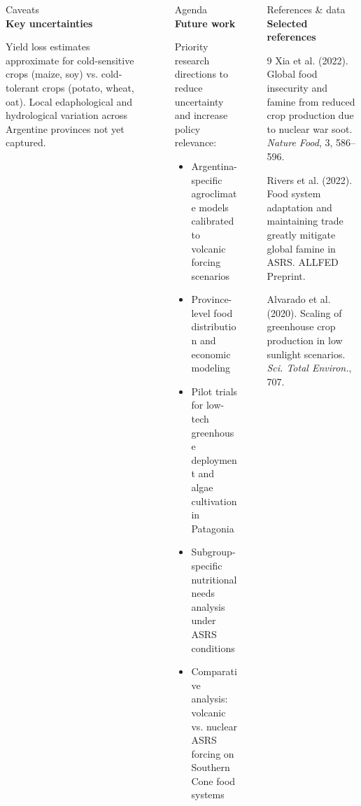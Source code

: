 \documentclass[final]{beamer}
\newlength{\sepwidth}
\newlength{\colwidth}
\newenvironment{labelblock}[2]{%
  \begin{block}{%
      {\small\color{structure.fg!70!bg}#1}%
      \\[2pt]                                  %
      {\large\bfseries#2}%
      }%
      }{%
  \end{block}%
  }
\newcommand{\separatorcolumn}{\begin{column}{\sepwidth}\end{column}}
\begin{document}
\begin{frame}[t]
\begin{columns}[t]
\begin{column}{\colwidth}
\begin{labelblock}{Caveats}{Key uncertainties}
        Yield loss estimates approximate for cold-sensitive crops (maize, soy) vs. cold-tolerant crops (potato, wheat, oat). Local edaphological and hydrological variation across Argentine provinces not yet captured.
      \end{labelblock}
    \end{column}

    \separatorcolumn

    \begin{column}{\colwidth}
      \begin{labelblock}{Agenda}{Future work}
        Priority research directions to reduce uncertainty and increase policy relevance:
        \begin{itemize}
          \item Argentina-specific agroclimate models calibrated to volcanic forcing scenarios
          \item Province-level food distribution and economic modeling
          \item Pilot trials for low-tech greenhouse deployment and algae cultivation in Patagonia
          \item Subgroup-specific nutritional needs analysis under ASRS conditions
          \item Comparative analysis: volcanic vs. nuclear ASRS forcing on Southern Cone food systems
        \end{itemize}
      \end{labelblock}
    \end{column}

    \separatorcolumn

    \begin{column}{\colwidth}
      \begin{labelblock}{References \& data}{Selected references}
        \begin{thebibliography}{9}
            Xia et al. (2022).
            \newblock Global food insecurity and famine from reduced crop production due to nuclear war soot.
            \newblock \emph{Nature Food}, 3, 586--596.

            Rivers et al. (2022).
            \newblock Food system adaptation and maintaining trade greatly mitigate global famine in ASRS.
            \newblock ALLFED Preprint.

            Alvarado et al. (2020).
            \newblock Scaling of greenhouse crop production in low sunlight scenarios.
            \newblock \emph{Sci. Total Environ.}, 707.


\end{thebibliography}
\end{labelblock}
\end{column}
\end{columns}
\end{frame}
\end{document}
